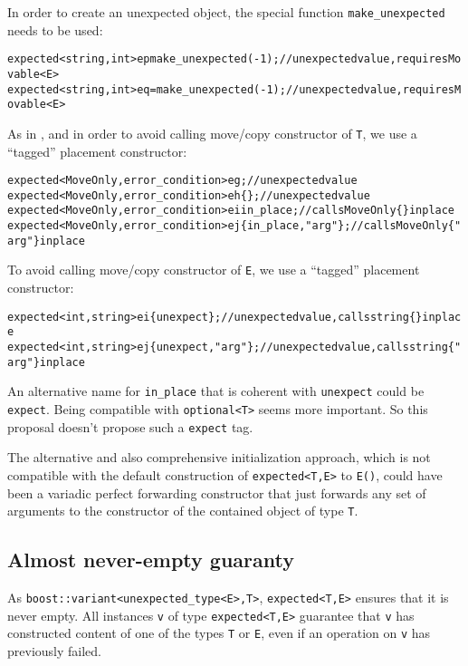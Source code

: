 \documentclass[a4paper,10pt]{article}
\newcommand{\cpp}[1]{\lstinline{#1}}
\begin{document}
\noindent
In order to create an unexpected object, the special function \cpp{make_unexpected} needs to be used:

\begin{alltt}
expected<string, int> ep{make_unexpected(-1)};    // unexpected value, requires Movable<E>
expected<string, int> eq = make_unexpected(-1);   // unexpected value, requires Movable<E>
\end{alltt}

\noindent
As in \cite{OptionalRev4}, and in order to avoid calling move/copy constructor of \cpp{T}, we use a ``tagged'' placement constructor: 

\begin{alltt}
expected<MoveOnly, error_condition> eg;                  // unexpected value
expected<MoveOnly, error_condition> eh\{\};                // unexpected value
expected<MoveOnly, error_condition> ei{in_place};        // calls MoveOnly\{\} in place
expected<MoveOnly, error_condition> ej\{in_place, "arg"\}; // calls MoveOnly\{"arg"\} in place
\end{alltt}

\noindent
To avoid calling move/copy constructor of \cpp{E}, we use a ``tagged'' placement constructor: 

\begin{alltt}
expected<int, string> ei\{unexpect\};         // unexpected value, calls string\{\} in place
expected<int, string> ej\{unexpect, "arg"\};  // unexpected value, calls string\{"arg"\} in place
\end{alltt}

\noindent
An alternative name for \cpp{in_place} that is coherent with \cpp{unexpect} could be \cpp{expect}. Being compatible with \cpp{optional<T>} seems more important. So this proposal doesn't propose such a \cpp{expect} tag.
\newline

The alternative and also comprehensive initialization approach, which is not compatible with the default construction of \cpp{expected<T,E>} to \cpp{E()}, could have been a variadic perfect forwarding constructor that just forwards any set of arguments to the constructor of the contained object of type \cpp{T}. 

\subsection{Almost never-empty guaranty}

As \cpp{boost::variant<unexpected_type<E>,T>}, \cpp{expected<T,E>} ensures that it is never empty. All instances \cpp{v} of type \cpp{expected<T,E>} guarantee that \cpp{v} has constructed content of one of the types \cpp{T} or \cpp{E}, even if an operation on \cpp{v} has previously failed.
\end{document}
